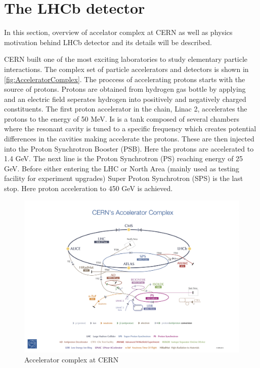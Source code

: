 \chapter{The LHCb detector}
\label{chap:dec}
In this section, overview of accelator complex at CERN as well as physics motivation behind \Gls{LHCb} detector and its details will be described.

CERN built one of the most exciting laboratories to study elementary particle interactions. The complex set of particle accelerators and detectors is shown in \autoref{fig:AcceleratorComplex}. The proccess of accelerating protons starts with the source of protons. Protons are obtained from hydrogen gas bottle by applying and an electric field seperates hydrogen into positively and negatively charged constituents. The first proton accelerator in the chain, Linac 2, accelerates the protons to the energy of 50 MeV. Is is a tank composed of several chambers where the resonant cavity is tuned to a specific frequency which creates potential differences in the cavities making accelerate the protons. These are then injected into the Proton Synchrotron Booster (PSB). Here the protons are accelerated to 1.4 GeV. The next line is the Proton Synchrotron (PS) reaching energy of 25 GeV. Before either entering the LHC or North Area (mainly used as testing facility for experiment upgrades) Super Proton Synchrotron (SPS) is the last stop. Here proton acceleration to 450 GeV is achieved.

\begin{figure}
  \centering
  \includegraphics[scale = 0.5]{figs/detector/AccComplex.jpg}
  \caption{Accelerator complex at CERN}
  \label{fig:AcceleratorComplex}
\end{figure}

